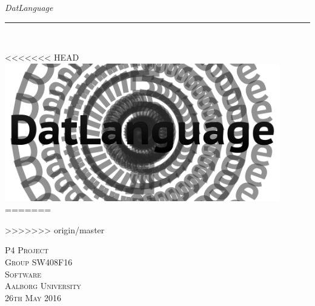 \thispagestyle{empty}
\begin{flushright}
\vspace{3cm}

\phantom{hul}

\phantom{hul}

\phantom{hul}

\textsl{\Huge DatLanguage} \\ \vspace{1cm}

\rule{13cm}{3mm} \\ \vspace{1.5cm}
\vspace{1cm}

<<<<<<< HEAD
\includegraphics[width=0.9\textwidth]{billeder/DatLanguage}
=======

>>>>>>> origin/master

\vspace{7cm} 
\textsc{\Large P4 Project \\
Group SW408F16 \\
Software\\
Aalborg University\\
26th May 2016\\}
\end{flushright}
